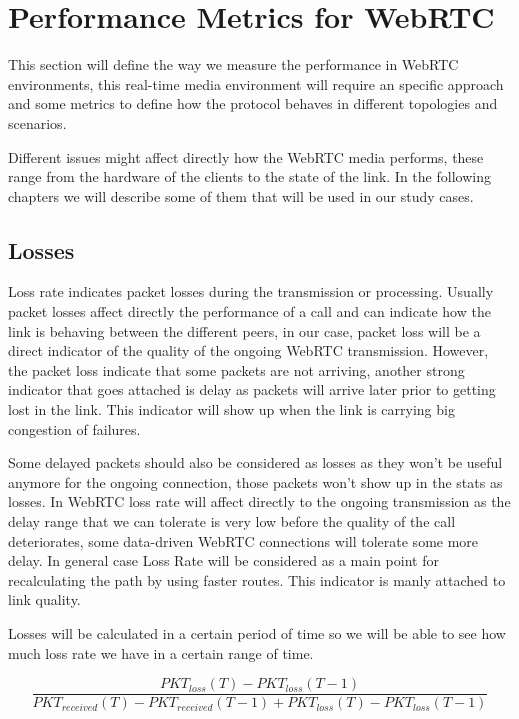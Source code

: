 \section{Performance Metrics for WebRTC}


\thispagestyle{empty}

This section will define the way we measure the performance in WebRTC environments, this real-time media environment will require an specific approach and some metrics to define how the protocol behaves in different topologies and scenarios. 

Different issues might affect directly how the WebRTC media performs, these range from the hardware of the clients to the state of the link. In the following chapters we will describe some of them that will be used in our study cases.

\subsection{Losses}

Loss rate indicates packet losses during the transmission or processing. Usually packet losses affect directly the performance of a call and can indicate how the link is behaving between the different peers, in our case, packet loss will be a direct indicator of the quality of the ongoing WebRTC transmission. However, the packet loss indicate that some packets are not arriving, another strong indicator that goes attached is delay as packets will arrive later prior to getting lost in the link. This indicator will show up when the link is carrying big congestion of failures. 

Some delayed packets should also be considered as losses as they won't be useful anymore for the ongoing connection, those packets won't show up in the stats as losses. In WebRTC loss rate will affect directly to the ongoing transmission as the delay range that we can tolerate is very low before the quality of the call deteriorates, some data-driven WebRTC connections will tolerate some more delay. In general case Loss Rate will be considered as a main point for recalculating the path by using faster routes. This indicator is manly attached to link quality.

Losses will be calculated in a certain period of time so we will be able to see how much loss rate we have in a certain range of time.

\begin{equation}
	\frac{PKT_{loss}(T) - PKT_{loss}(T-1)}{PKT_{received}(T) - PKT_{received}(T-1) + PKT_{loss}(T) - PKT_{loss}(T-1)}
	\label{eq:PKTloss}
\end{equation}

